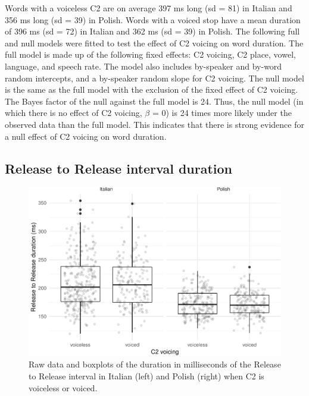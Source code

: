 \documentclass[preprint]{JASAnew}
\begin{document}
Words with a voiceless C2 are on average 397 ms long (sd = 81) in
Italian and 356 ms long (sd = 39) in Polish. Words with a voiced stop
have a mean duration of 396 ms (sd = 72) in Italian and 362 ms (sd = 39)
in Polish. The following full and null models were fitted to test the
effect of C2 voicing on word duration. The full model is made up of the
following fixed effects: C2 voicing, C2 place, vowel, language, and
speech rate. The model also includes by-speaker and by-word random
intercepts, and a by-speaker random slope for C2 voicing. The null model
is the same as the full model with the exclusion of the fixed effect of
C2 voicing. The Bayes factor of the null against the full model is 24.
Thus, the null model (in which there is no effect of C2 voicing,
\(\beta\) = 0) is 24 times more likely under the observed data than the
full model. This indicates that there is strong evidence for a null
effect of C2 voicing on word duration.

\hypertarget{release-to-release-interval-duration}{%
\subsection{Release to Release interval
duration}\label{release-to-release-interval-duration}}

\begin{figure}
\includegraphics[width=\linewidth]{2018-jasa_files/figure-latex/rr-plot-1} \caption{Raw data and boxplots of the duration in milliseconds of the Release to Release interval in Italian (left) and Polish (right) when C2 is voiceless or voiced.}\label{f:rr-plot}
\end{figure}
\end{document}
